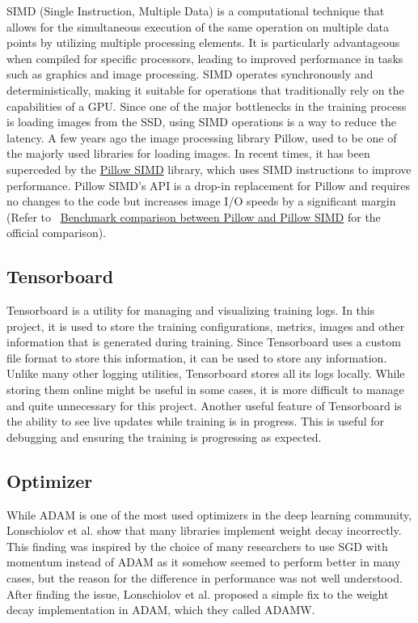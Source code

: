 \documentclass[a4paper,11pt,openright]{book}
\begin{document}
SIMD (Single Instruction, Multiple Data) is a computational technique that allows for the simultaneous execution of the same operation on multiple data points by utilizing multiple processing elements. It is particularly advantageous when compiled for specific processors, leading to improved performance in tasks such as graphics and image processing. SIMD operates synchronously and deterministically, making it suitable for operations that traditionally rely on the capabilities of a GPU. Since one of the major bottlenecks in the training process is loading images from the SSD, using SIMD operations is a way to reduce the latency. A few years ago the image processing library Pillow, used to be one of the majorly used libraries for loading images. In recent times, it has been superceded by the \href{https://github.com/uploadcare/pillow-simd}{Pillow SIMD} library, which uses SIMD instructions to improve performance. Pillow SIMD's API is a drop-in replacement for Pillow and requires no changes to the code but increases image I/O speeds by a significant margin (Refer to ~\href{https://python-pillow.org/pillow-perf/}{Benchmark comparison between Pillow and Pillow SIMD} for the official comparison).

\subsection{Tensorboard}
Tensorboard is a utility for managing and visualizing training logs. In this project, it is used to store the training configurations, metrics, images and other information that is generated during training. Since Tensorboard uses a custom file format to store this information, it can be used to store any information. Unlike many other logging utilities, Tensorboard stores all its logs locally. While storing them online might be useful in some cases, it is more difficult to manage and quite unnecessary for this project.
Another useful feature of Tensorboard is the ability to see live updates while training is in progress. This is useful for debugging and ensuring the training is progressing as expected.

\subsection{Optimizer}
While ADAM \cite{kingmaAdamMethodStochastic2014} is one of the most used optimizers in the deep learning community, Lonschiolov et al. \cite{loshchilovDecoupledWeightDecay2019} show that many libraries implement weight decay incorrectly. This finding was inspired by the choice of many researchers to use SGD with momentum instead of ADAM as it somehow seemed to perform better in many cases, but the reason for the difference in performance was not well understood. After finding the issue, Lonschiolov et al. proposed a simple fix to the weight decay implementation in ADAM, which they called ADAMW.
\end{document}
